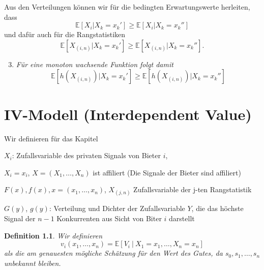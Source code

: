\documentclass[12pt]{extreport} %
\theoremstyle{named}
\theoremstyle{itshape}
\newtheorem*{definition}{Definition}
\theoremstyle{normal}
\begin{document}
Aus den Verteilungen können wir für die bedingten Erwartungswerte herleiten, dass
	$$ \mathbb{E}\left[ X_{i} \big| X_{k} = x_{k}' \right] \geq \mathbb{E}\left[ X_{i} \big| X_{k} = x_{k}'' \right] $$
und dafür auch für die Rangstatistiken
	$$ \mathbb{E}\left[ X_{(i,n)} \big| X_{k} = x_{k}' \right] \geq \mathbb{E}\left[ X_{(i,n)} \big| X_{k} = x_{k}'' \right]. $$
	\begin{enumerate} \setcounter{enumi}{2}
		\item \textit{Für eine monoton wachsende Funktion folgt damit}
		 $$\mathbb{E}\left[ h\left(X_{(i,n)} \right) \big| X_{k} = x_{k}' \right] \geq \mathbb{E}\left[ h\left(X_{(i,n)} \right)\big| X_{k} = x_{k}'' \right]$$
	\end{enumerate}

\chapter{IV-Modell (Interdependent Value)}

Wir definieren für das Kapitel

\begin{description}
	\item $X_{i}$: Zufallsvariable des privaten Signals von Bieter $i$,
	\item $X_{i} = x_{i}$, $X = (X_{1}, \dotsc, X_{n})$ ist affiliert (Die Signale der Bieter sind affiliert)
	\item $F(x), f(x), x = (x_1, \dotsc, x_n)$, $X_{(j,n)}$ Zufallsvariable der j-ten Rangstatistik
	\item $G(y)$, $g(y)$: Verteilung und Dichter der Zufallsvariable $Y$, die das höchste Signal der $n-1$ Konkurrenten aus Sicht von Biter $i$ darstellt
\end{description}

\begin{definition}
	Wir definieren 
	$$ v_{i}(x_1, \dotsc, x_{n}) = \mathbb{E}\left[ V_{i} ~\big|~ X_1 = x_1, \dotsc, X_n = x_n \right]$$
	als die am genauesten mögliche Schätzung für den Wert des Gutes, da $s_{0}, s_{1}, \dotsc, s_{n}$ unbekannt bleiben.
\end{definition}
\end{document}
